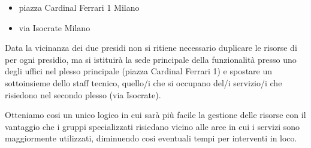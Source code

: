 \begin{itemize}
\item{piazza Cardinal Ferrari 1 Milano}
\item{via Isocrate Milano}
\end{itemize}

Data la vicinanza dei due presidi non si ritiene necessario duplicare le risorse di  per ogni presidio, ma si istituirà la sede principale della funzionalità presso uno degli uffici nel plesso principale (piazza Cardinal Ferrari 1) e spostare un sottoinsieme dello staff tecnico, quello/i che si occupano del/i servizio/i che risiedono nel secondo plesso (via Isocrate).

Otteniamo cosi un unico  logico in cui sarà più facile la gestione delle risorse con il vantaggio che i gruppi specializzati risiedano vicino alle aree in cui i servizi sono maggiormente utilizzati, diminuendo cosi eventuali tempi per interventi in loco.